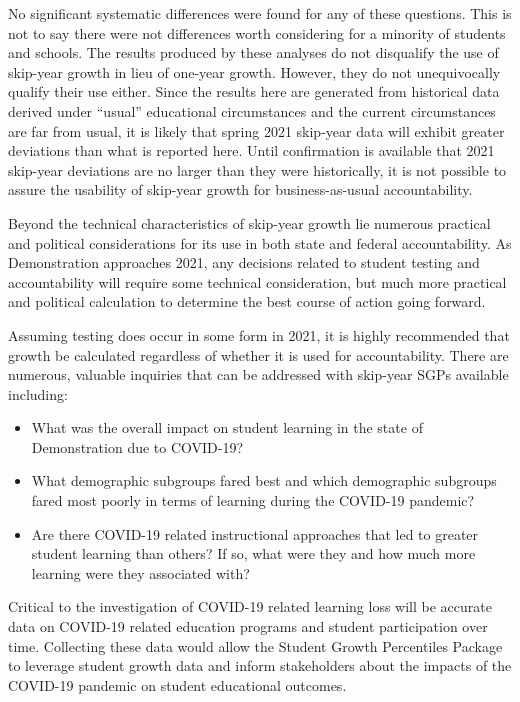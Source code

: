 \documentclass[12pt]{article}
\providecommand{\tightlist}{%
  \setlength{\itemsep}{0pt}\setlength{\parskip}{0pt}}
\begin{document}
\noindent No significant systematic differences were found for any of
these questions. This is not to say there were not differences worth
considering for a minority of students and schools. The results produced
by these analyses do not disqualify the use of skip-year growth in lieu
of one-year growth. However, they do not unequivocally qualify their use
either. Since the results here are generated from historical data
derived under ``usual'' educational circumstances and the current
circumstances are far from usual, it is likely that spring 2021
skip-year data will exhibit greater deviations than what is reported
here. Until confirmation is available that 2021 skip-year deviations are
no larger than they were historically, it is not possible to assure the
usability of skip-year growth for business-as-usual accountability.

Beyond the technical characteristics of skip-year growth lie numerous
practical and political considerations for its use in both state and
federal accountability. As Demonstration approaches 2021, any decisions
related to student testing and accountability will require some
technical consideration, but much more practical and political
calculation to determine the best course of action going forward.

Assuming testing does occur in some form in 2021, it is highly
recommended that growth be calculated regardless of whether it is used
for accountability. There are numerous, valuable inquiries that can be
addressed with skip-year SGPs available including:

\begin{itemize}
\tightlist
\item
  What was the overall impact on student learning in the state of
  Demonstration due to COVID-19?
\item
  What demographic subgroups fared best and which demographic subgroups
  fared most poorly in terms of learning during the COVID-19 pandemic?
\item
  Are there COVID-19 related instructional approaches that led to
  greater student learning than others? If so, what were they and how
  much more learning were they associated with?
\end{itemize}

\noindent Critical to the investigation of COVID-19 related learning
loss will be accurate data on COVID-19 related education programs and
student participation over time. Collecting these data would allow the
Student Growth Percentiles Package to leverage student growth data and
inform stakeholders about the impacts of the COVID-19 pandemic on
student educational outcomes.
\end{document}
